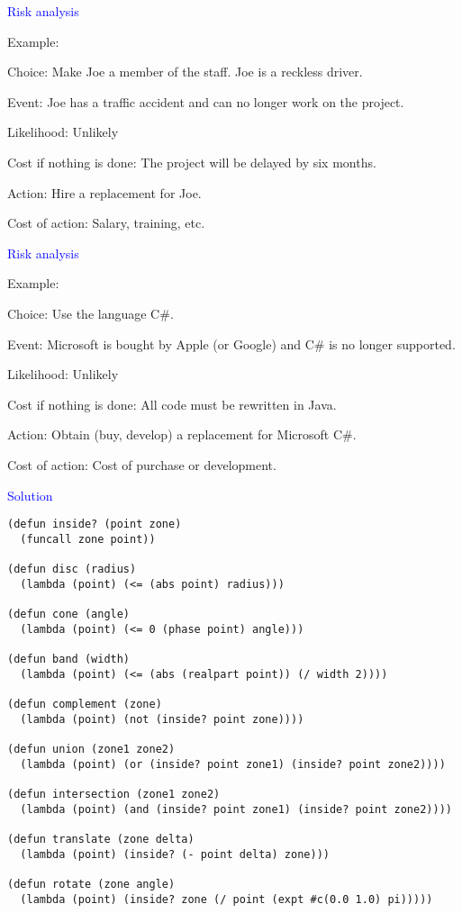 \documentclass{slides}
\newcommand{\ti}[1]{\begin{center}\Large{\textcolor{blue}{#1}}\end{center}}
\begin{document}
\begin{slide}\ti{Risk analysis}

Example:

Choice: Make Joe a member of the staff.  Joe is a reckless driver.

Event: Joe has a traffic accident and can no longer work on the
project.

Likelihood: Unlikely

Cost if nothing is done: The project will be delayed by six months.

Action: Hire a replacement for Joe.

Cost of action: Salary, training, etc.

\vfill\end{slide}
\begin{slide}\ti{Risk analysis}

Example:

Choice: Use the language C\#.

Event: Microsoft is bought by Apple (or Google) and C\# is no longer
supported.

Likelihood: Unlikely

Cost if nothing is done: All code must be rewritten in Java.

Action: Obtain (buy, develop) a replacement for Microsoft C\#.

Cost of action: Cost of purchase or development.

\vfill\end{slide}
\begin{slide}\ti{Solution}

{\tiny\begin{verbatim}
(defun inside? (point zone)
  (funcall zone point))

(defun disc (radius)
  (lambda (point) (<= (abs point) radius)))

(defun cone (angle)
  (lambda (point) (<= 0 (phase point) angle)))

(defun band (width)
  (lambda (point) (<= (abs (realpart point)) (/ width 2))))

(defun complement (zone)
  (lambda (point) (not (inside? point zone))))

(defun union (zone1 zone2)
  (lambda (point) (or (inside? point zone1) (inside? point zone2))))

(defun intersection (zone1 zone2)
  (lambda (point) (and (inside? point zone1) (inside? point zone2))))

(defun translate (zone delta)
  (lambda (point) (inside? (- point delta) zone)))

(defun rotate (zone angle)
  (lambda (point) (inside? zone (/ point (expt #c(0.0 1.0) pi)))))
\end{verbatim}
}

\vfill\end{slide}


\end{document}

